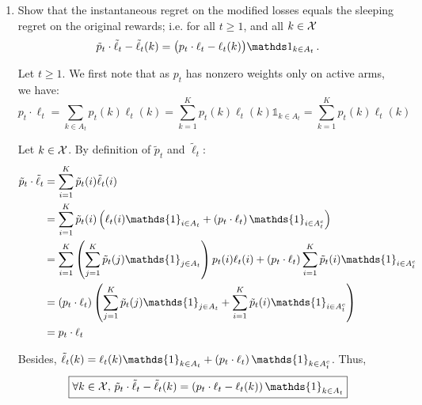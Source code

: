 \begin{enumerate}[resume]
	\begin{enumerate}[label=(\alph*)]
 		\item Show that the instantaneous regret on the modified losses equals the sleeping regret on the original rewards; i.e. for all $t\geq 1$, and all $k \in \mathcal{X}$
		\begin{equation*}
			 \tilde p_t \cdot \tilde \ell_t - \tilde \ell_t(k)  = \big(p_t \cdot \ell_t - \ell_t(k)\big) \indic_{k \in A_t} \,.
		\end{equation*}
		
		\begin{solution}
		Let $t \geq 1$. We first note that as $p_t$ has nonzero weights only on active arms, we have:
        \begin{equation*}
            p_t \cdot \ell_t = \sum_{k \in A_t} p_t(k) \ell_t(k) = \sum_{k=1}^K p_t(k) \ell_t(k) \mathds{1}_{k \in A_t} = \sum_{k=1}^K p_t(k) \ell_t(k)
        \end{equation*}
        
        Let $k \in \mathcal{X}$. By definition of $\tilde{p}_t$ and $\tilde{\ell}_t$:
        \begin{equation*}
            \begin{aligned}
            \tilde{p}_t \cdot \tilde{\ell}_t &= \sum_{i=1}^K \tilde{p}_t(i) \tilde{\ell}_t(i) \\
            &= \sum_{i=1}^K \tilde{p}_t(i) \br{\ell_t(i) \mathds{1}_{i \in A_t} + \br{p_t \cdot \ell_t} \mathds{1}_{i \in A_t^c}} \\
            &= \sum_{i=1}^K \br{\sum_{j=1}^K \tilde{p}_t(j) \mathds{1}_{j \in A_t}} p_t(i) \ell_t(i) + \br{p_t \cdot \ell_t} \sum_{i=1}^K \tilde{p}_t(i) \mathds{1}_{i \in A_t^c} \\
            &= \br{p_t \cdot \ell_t} \br{\sum_{j=1}^K \tilde{p}_t(j) \mathds{1}_{j \in A_t} + \sum_{i=1}^K \tilde{p}_t(i) \mathds{1}_{i \in A_t^c}} \\
            &= p_t \cdot \ell_t
            \end{aligned}
        \end{equation*}
        
        Besides, $\tilde{\ell}_t(k) = \ell_t(k) \mathds{1}_{k \in A_t} + \br{p_t \cdot \ell_t} \mathds{1}_{k \in A_t^c}$. Thus,
        \begin{equation*}
            \boxed{\forall k \in \Xcal,\, \tilde{p}_t \cdot \tilde{\ell}_t - \tilde{\ell}_t(k) = \br{p_t \cdot \ell_t - \ell_t(k)} \mathds{1}_{k \in A_t}}
        \end{equation*}
		\end{solution}
		

\end{enumerate}
\end{enumerate}
